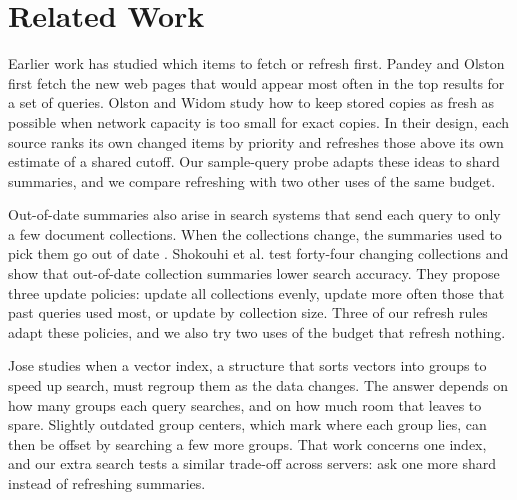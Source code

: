 \section{Related Work}
\label{sec:related}


Earlier work has studied which items to fetch or refresh first.
Pandey and Olston \cite{pandey2008crawlorder} first fetch the new web pages that would appear most often in the top results for a set of queries.
Olston and Widom \cite{olston2002besteffort} study how to keep stored copies as fresh as possible when network capacity is too small for exact copies.
In their design, each source ranks its own changed items by priority and refreshes those above its own estimate of a shared cutoff.
Our sample-query probe adapts these ideas to shard summaries, and we compare refreshing with two other uses of the same budget.

Out-of-date summaries also arise in search systems that send each query to only a few document collections.
When the collections change, the summaries used to pick them go out of date \cite{ipeirotis2005changes,shokouhi2007updating}.
Shokouhi et al. \cite{shokouhi2007updating} test forty-four changing collections and show that out-of-date collection summaries lower search accuracy.
They propose three update policies: update all collections evenly, update more often those that past queries used most, or update by collection size.
Three of our refresh rules adapt these policies, and we also try two uses of the budget that refresh nothing.

Jose \cite{jose2026repartition} studies when a vector index, a structure that sorts vectors into groups to speed up search, must regroup them as the data changes.
The answer depends on how many groups each query searches, and on how much room that leaves to spare.
Slightly outdated group centers, which mark where each group lies, can then be offset by searching a few more groups.
That work concerns one index, and our extra search tests a similar trade-off across servers: ask one more shard instead of refreshing summaries.

